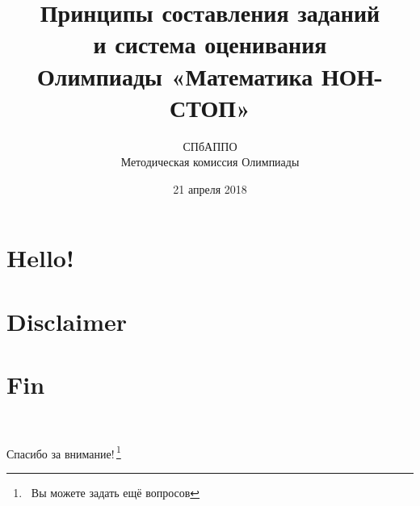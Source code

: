\documentclass[aspectratio=1610,12pt]{beamer}
\title[Математика НОН-СТОП $\mid$ Семинар]
	{\bfseries Принципы составления заданий \\
		и система оценивания \\
		Олимпиады «Математика НОН-СТОП»}
\author[Б.А.\,Золотов, Д.Г.\,Штукенберг]
	{СПбАППО \\ \vspace{0.3cm} Методическая комиссия Олимпиады}
\institute[\textcolor{white}{«Время науки», ЛНМО, СПбАППО}]{}
\date{21 апреля 2018}
\def\fram#1#2{\begin{frame}\frametitle{\bf #1}#2\end{frame}}
\begin{document}
\section[Приветствие]{Hello!}
\begin{frame}\titlepage\end{frame}


\section[Дисклеймер]{Disclaimer}

\fram{ }{ }








\section[Конец]{Fin}
\renewcommand{\thefootnote}{/*\!/}
\begin{frame}
	\ \\
	\centerline{\huge Спасибо за внимание!\,\footnote{\ Вы можете задать ещё вопросов}}
\end{frame}
\end{document}
